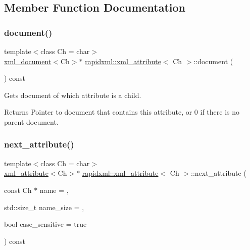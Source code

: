 \subsection{Member Function Documentation}
\mbox{\label{classrapidxml_1_1xml__attribute_ab0ff3bc7880a6969ddcf0bb1e0444077}} 
\subsubsection{\texorpdfstring{document()}{document()}}
{\footnotesize\ttfamily template$<$class Ch = char$>$ \\
\hyperlink{classrapidxml_1_1xml__document}{xml\+\_\+document}$<$Ch$>$$\ast$ \hyperlink{classrapidxml_1_1xml__attribute}{rapidxml\+::xml\+\_\+attribute}$<$ Ch $>$\+::document (\begin{DoxyParamCaption}{ }\end{DoxyParamCaption}) const\hspace{0.3cm}{\ttfamily [inline]}}

Gets document of which attribute is a child. \begin{DoxyReturn}{Returns}
Pointer to document that contains this attribute, or 0 if there is no parent document. 
\end{DoxyReturn}
\mbox{\label{classrapidxml_1_1xml__attribute_affd0c8d0a9020df0998c507cae5474e5}} 
\subsubsection{\texorpdfstring{next\+\_\+attribute()}{next\_attribute()}}
{\footnotesize\ttfamily template$<$class Ch = char$>$ \\
\hyperlink{classrapidxml_1_1xml__attribute}{xml\+\_\+attribute}$<$Ch$>$$\ast$ \hyperlink{classrapidxml_1_1xml__attribute}{rapidxml\+::xml\+\_\+attribute}$<$ Ch $>$\+::next\+\_\+attribute (\begin{DoxyParamCaption}\item[{const Ch $\ast$}]{name = {},  }\item[{std\+::size\+\_\+t}]{name\+\_\+size = {},  }\item[{bool}]{case\+\_\+sensitive = {\ttfamily true} }\end{DoxyParamCaption}) const\hspace{0.3cm}{\ttfamily [inline]}}


